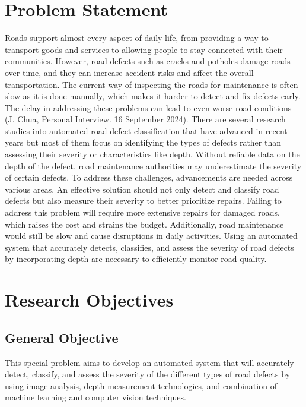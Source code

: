 \section{Problem Statement}
Roads support almost every aspect of daily life, from providing a way to transport goods and services to allowing people to stay connected with their communities. However, road defects such as cracks and potholes damage roads over time, and they can increase accident risks and affect the overall transportation. The current way of inspecting the roads for maintenance is often slow as it is done manually, which makes it harder to detect and fix defects early. The delay in addressing these problems can lead to even worse road conditions (J. Chua, Personal Interview. 16 September 2024). There are several research studies into automated road defect classification that have advanced in recent years but most of them focus on identifying the types of defects rather than assessing their severity or characteristics like depth. Without reliable data on the depth of the defect, road maintenance authorities may underestimate the severity of certain defects. To address these challenges, advancements are needed across various areas. An effective solution should not only detect and classify road defects but also measure their severity to better prioritize repairs. Failing to address this problem will require more extensive repairs for damaged roads, which raises the cost and strains the budget. Additionally, road maintenance would still be slow and cause disruptions in daily activities. Using an automated system that accurately detects, classifies, and assess the severity of road defects by incorporating depth are necessary to efficiently monitor road quality.


\section{Research Objectives}
\label{sec:researchobjectives}

\subsection{General Objective}
\label{sec:generalobjective}

This special problem aims to develop an automated system that will accurately detect, classify, and assess the severity of the different types of road defects by using image analysis, depth measurement technologies, and combination of machine learning and computer vision techniques. 



